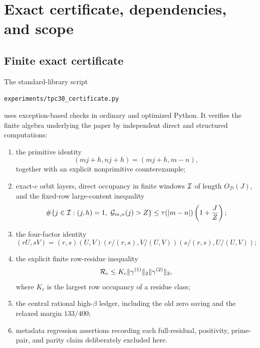 \section{Exact certificate, dependencies, and scope}
\label{sec:tpc30-certificate}

\subsection{Finite exact certificate}

The standard-library script
\begin{center}
\texttt{experiments/tpc30\_certificate.py}
\end{center}
uses exception-based checks in ordinary and optimized Python.  It
verifies the finite algebra underlying the paper by independent direct
and structured computations:
\begin{enumerate}[label=\textup{(\roman*)}]
 \item the primitive identity
 \[
 (mj+h,nj+h)=(mj+h,m-n),
 \]
 together with an explicit nonprimitive counterexample;
 \item exact-$c$ orbit layers, direct occupancy in finite windows
 $\mathcal I$ of length $O_{\mathscr D}(J)$, and the fixed-row large-content
 inequality
 \[
 \#\{j\in\mathcal I:(j,h)=1,\ \mathcal G_{m,n}(j)>Z\}
 \le\tau(|m-n|)\left(1+\frac JZ\right);
 \]
 \item the four-factor identity
 \[
 (rU,sV)
 =(r,s)(U,V)(r/(r,s),V/(U,V))
              (s/(r,s),U/(U,V));
 \]
 \item the explicit finite row-residue inequality
 \[
 \mathcal R_c\le K_c\|\gamma^{(1)}\|_2\|\gamma^{(2)}\|_2,
 \]
 where $K_c$ is the largest row occupancy of a residue class;
 \item the central rational high-$\beta$ ledger, including the old zero
 saving and the relaxed margin $133/400$;
 \item metadata regression assertions recording each full-residual,
 positivity, prime-pair, and parity claim deliberately excluded here.
\end{enumerate}


